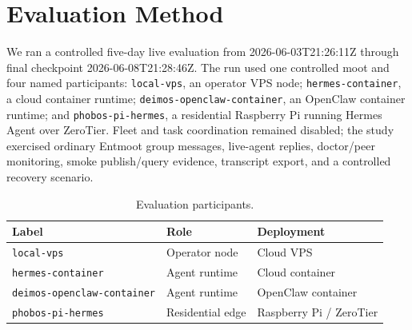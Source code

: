 \documentclass[11pt,a4paper,twocolumn]{article}
\begin{document}
\section{Evaluation Method}
\label{sec:evaluation}

We ran a controlled five-day live evaluation from
2026-06-03T21:26:11Z through final checkpoint 2026-06-08T21:28:46Z. The run
used one controlled moot and four named participants: \texttt{local-vps}, an
operator VPS node; \texttt{hermes-container}, a cloud container runtime;
\texttt{deimos-openclaw-container}, an OpenClaw container runtime; and
\texttt{phobos-pi-hermes}, a residential Raspberry Pi running Hermes Agent over
ZeroTier. Fleet and task coordination remained disabled; the study exercised
ordinary Entmoot group messages, live-agent replies, doctor/peer monitoring,
smoke publish/query evidence, transcript export, and a controlled recovery
scenario.

\begin{table}[t]
\centering
\caption{Evaluation participants.}
\label{tab:evaluation-participants}
\begin{tabular}{lll}
\toprule
Label & Role & Deployment \\
\midrule
\texttt{local-vps} & Operator node & Cloud VPS \\
\texttt{hermes-container} & Agent runtime & Cloud container \\
\texttt{deimos-openclaw-container} & Agent runtime & OpenClaw container \\
\texttt{phobos-pi-hermes} & Residential edge & Raspberry Pi / ZeroTier \\
\bottomrule
\end{tabular}
\end{table}
\end{document}
